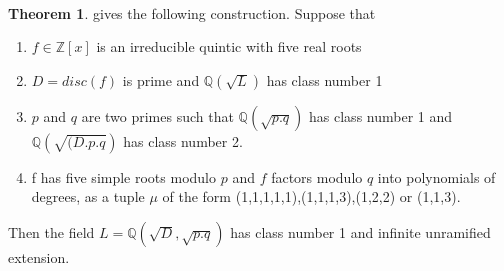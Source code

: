 \documentclass[12pt]{extarticle}
\newcommand{\<}{\langle}
\renewcommand{\>}{\rangle}
\theoremstyle{definition}
\newtheorem{theorem}{Theorem}
\begin{document}
\
\begin{theorem}

\cite{BRINK} gives the following construction. Suppose that \begin{enumerate}
    \item $f\in \mathbb{Z}[x]$ is an irreducible quintic with five real roots
    \item $D = disc(f)$ is prime and $\mathbb{Q}(\sqrt{L})$ has class number 1
    \item $p$ and $q$ are two primes such that $\mathbb{Q}(\sqrt{p.q})$ has class number 1 and $\mathbb{Q}(\sqrt{(D.p.q})$ has class number 2.
    \item f has five simple roots modulo $p$ and $f$ factors modulo $q$ into polynomials of degrees, as a tuple $\mu$ of the form (1,1,1,1,1),(1,1,1,3),(1,2,2) or (1,1,3).
\end{enumerate}
Then the field $L=\mathbb{Q}(\sqrt{D},\sqrt{p.q})$ has class number 1 and infinite unramified extension.
\end{theorem}
\end{document}
